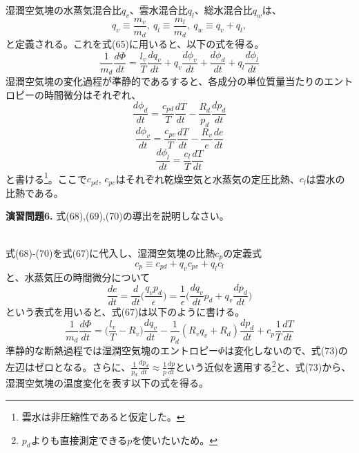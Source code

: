 \documentclass{jsarticle}
\begin{document}
湿潤空気塊の水蒸気混合比$q_{v}$、雲水混合比$q_{l}$、総水混合比$q_{w}$は、
\begin{equation}
 q_{v} \equiv \frac{m_{v}}{m_{d}}, \  q_{l} \equiv \frac{m_{l}}{m_{d}}, \  q_{w}\equiv q_{v}+ q_{l},
\end{equation}
と定義される。これを式(65)に用いると、以下の式を得る。
\begin{equation}
 \frac{1}{m_{d}}\frac{d\Phi}{dt} = \frac{l_{v}}{T}\frac{dq_{v}}{dt}+q_{v}\frac{d\phi_{v}}{dt}+\frac{d\phi_{d}}{dt}+q_{l}\frac{d\phi_{l}}{dt}
\end{equation}
湿潤空気塊の変化過程が準静的であるすると、各成分の単位質量当たりのエントロピーの時間微分はそれぞれ、
\begin{equation}
\frac{d\phi_{d}}{dt}=\frac{c_{pd}}{T}\frac{dT}{dt}-\frac{R_{d}}{p_{d}}\frac{dp_{d}}{dt}
\end{equation}
\begin{equation}
\frac{d\phi_{v}}{dt}=\frac{c_{pv}}{T}\frac{dT}{dt}-\frac{R_{v}}{e}\frac{de}{dt}
\end{equation}
\begin{equation}
\frac{d\phi_{l}}{dt}=\frac{c_{l}}{T}\frac{dT}{dt}
\end{equation}
と書ける\footnote{雲水は非圧縮性であると仮定した。}。ここで$c_{pd}$, $c_{pv}$はそれぞれ乾燥空気と水蒸気の定圧比熱、$c_{l}$は雲水の比熱である。
\\

\begin{itembox}[l]{\bf{演習問題6.}}
式(68),(69),(70)の導出を説明しなさい。
\end{itembox}
\\

式(68)-(70)を式(67)に代入し、湿潤空気塊の比熱$c_{p}$の定義式
\begin{equation}
c_{p} \equiv c_{pd}+q_{v}c_{pv}+q_{l}c_{l}
\end{equation}
と、水蒸気圧の時間微分について
\begin{equation}
\frac{de}{dt}=\frac{d}{dt}{\bigg (}\frac{q_{v}p_{d}}{\epsilon}{\bigg )}=\frac{1}{\epsilon}{\bigg (}\frac{dq_{v}}{dt}p_{d}+q_{v}\frac{dp_{d}}{dt}{\bigg )}
\end{equation}
という表式を用いると、式(67)は以下のように書ける。
\begin{equation}
\frac{1}{m_{d}}\frac{d\Phi}{dt} = {\bigg (}\frac{l_{v}}{T}-R_{v}{\bigg )}\frac{dq_{v}}{dt}-\frac{1}{p_{d}}(R_{v}q_{v}+R_{d})\frac{dp_{d}}{dt}+c_{p}\frac{1}{T}\frac{dT}{dt}
\end{equation}
準静的な断熱過程では湿潤空気塊のエントロピー$\Phi$は変化しないので、式(73)の左辺はゼロとなる。さらに、$\frac{1}{p_{d}}\frac{dp_{d}}{dt}\approx \frac{1}{p}\frac{dp}{dt}$という近似を適用する\footnote{$p_{d}$よりも直接測定できる$p$を使いたいため。}と、式(73)から、湿潤空気塊の温度変化を表す以下の式を得る。
\end{document}
